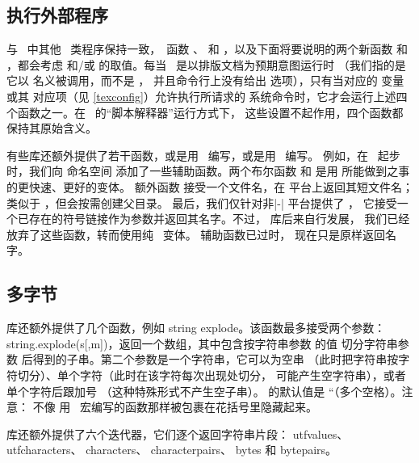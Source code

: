 \subsection{执行外部程序}

与 \TEXLIVE\ 中其他 \TEX\ 类程序保持一致，\LUA\ 函数 、
 和 ，以及下面将要说明的两个新函数
 和 ，都会考虑  和/或
 的取值。每当 \LUATEX\ 是以排版文档为预期意图运行时
（我们指的是它以  名义被调用，而不是 ，
并且命令行上没有给出  选项），只有当对应的 
变量或其  对应项（见 \ref{texconfig}）允许执行所请求的
系统命令时，它才会运行上述四个函数之一。在 \LUATEX\ 的“脚本解释器”运行方式下，
这些设置不起作用，四个函数都保持其原始含义。

有些库还额外提供了若干函数，或是用 \CCODE\ 编写，或是用 \LUA\ 编写。
例如，在 \LUATEX\ 起步时，我们向  命名空间 
添加了一些辅助函数。两个布尔函数  和 
是用  所能做到之事的更快速、更好的变体。
额外函数  接受一个文件名，在  平台上返回其短文件名；
 类似于 ，但会按需创建父目录。
最后，我们仅针对非|-| 平台提供了 ，
它接受一个已存在的符号链接作为参数并返回其名字。不过， 库后来自行发展，
我们已经放弃了这些函数，转而使用纯 \LUA\ 变体。 辅助函数已过时，
现在只是原样返回名字。

\subsection{多字节 }

 库还额外提供了几个函数，例如 \libidx
{string} {explode}。该函数最多接受两个参数：\type
{string.explode(s[,m])}，返回一个数组，其中包含按字符串参数  的值
切分字符串参数  后得到的子串。第二个参数是一个字符串，它可以为空串
（此时把字符串按字符切分）、单个字符（此时在该字符每次出现处切分，
可能产生空字符串），或者单个字符后跟加号 \type {+}（这种特殊形式不产生空子串）。
 的默认值是 ``\type { +}（多个空格）。注意： 不像
用 \TEX\ 宏编写的函数那样被包裹在花括号里隐藏起来。

 库还额外提供了六个迭代器，它们逐个返回字符串片段：
 {utfvalues}、 {utfcharacters}、
 {characters}、 {characterpairs}、
 {bytes} 和  {bytepairs}。

